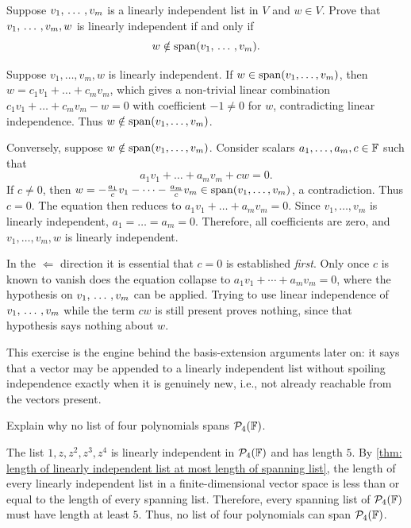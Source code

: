 \begin{xrcs}
  Suppose $v_1, {\, \ldots \,\,}, v_m$ is a linearly independent list in $V$ and $w \in V$. Prove that $v_1, {\, \ldots \,\,}, v_m, w$ is linearly independent if and only if
  \begin{equation}
    w \notin \operatorname{span} (v_1, {\, \ldots \,\,}, v_m).
  \end{equation}
  \begin{xprf}
    \Rightarrowdirection Suppose $v_1, \dots, v_m, w$ is linearly independent. If $w \in \operatorname{span} (v_1, \dots, v_m)$, then $w = c_1 v_1 + \dots + c_m v_m$, which gives a non-trivial linear combination $c_1 v_1 + \dots + c_m v_m - w = 0$ with coefficient $-1 \neq 0$ for $w$, contradicting linear independence. Thus $w \notin \operatorname{span} (v_1, \dots, v_m)$.

    \Leftarrowdirection Conversely, suppose $w \notin \operatorname{span} (v_1, \dots, v_m)$. Consider scalars $a_1, \dots, a_m, c \in \mathbb{F}$ such that
    \[
      a_1 v_1 + \dots + a_m v_m + c w = 0.
    \]
    If $c \neq 0$, then $w = -\frac{a_1}{c}v_1 - \dots - \frac{a_m}{c}v_m \in \operatorname{span} (v_1, \dots, v_m)$, a contradiction.
    Thus $c = 0$. The equation then reduces to $a_1 v_1 + \dots + a_m v_m = 0$.
    Since $v_1, \dots, v_m$ is linearly independent, $a_1 = \dots = a_m = 0$.
    Therefore, all coefficients are zero, and $v_1, \dots, v_m, w$ is linearly independent.
  \end{xprf}
\end{xrcs}

\begin{ainote}
  In the $\Leftarrow$ direction it is essential that $c = 0$ is established \emph{first}. Only once $c$ is known to vanish does the equation collapse to $a_1 v_1 + \cdots + a_m v_m = 0$, where the hypothesis on $v_1, {\, \ldots \,\,}, v_m$ can be applied. Trying to use linear independence of $v_1, {\, \ldots \,\,}, v_m$ while the term $cw$ is still present proves nothing, since that hypothesis says nothing about $w$.

  This exercise is the engine behind the basis-extension arguments later on: it says that a vector may be appended to a linearly independent list without spoiling independence exactly when it is genuinely new, i.e., not already reachable from the vectors present.
\end{ainote}

\begin{xrcs}
  Explain why no list of four polynomials spans $\mathcal{P}_4(\mathbb{F})$.

  \begin{xsol}
    The list $1, z, z^2, z^3, z^4$ is linearly independent in $\mathcal{P}_4(\mathbb{F})$ and has length $5$. By \ref{thm: length of linearly independent list at most length of spanning list}, the length of every linearly independent list in a finite-dimensional vector space is less than or equal to the length of every spanning list.
    Therefore, every spanning list of $\mathcal{P}_4(\mathbb{F})$ must have length at least $5$. Thus, no list of four polynomials can span $\mathcal{P}_4(\mathbb{F})$.
  \end{xsol}
\end{xrcs}

